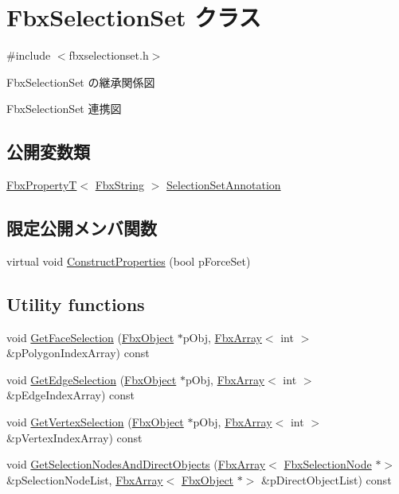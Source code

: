 \hypertarget{class_fbx_selection_set}{}\section{Fbx\+Selection\+Set クラス}
\label{class_fbx_selection_set}


{\ttfamily \#include $<$fbxselectionset.\+h$>$}



Fbx\+Selection\+Set の継承関係図


Fbx\+Selection\+Set 連携図
\subsection*{公開変数類}
\begin{DoxyCompactItemize}
\item 
\hyperlink{class_fbx_property_t}{Fbx\+PropertyT}$<$ \hyperlink{class_fbx_string}{Fbx\+String} $>$ \hyperlink{class_fbx_selection_set_abe27bd368bd6e3df129e808900a72f19}{Selection\+Set\+Annotation}
\end{DoxyCompactItemize}
\subsection*{限定公開メンバ関数}
\begin{DoxyCompactItemize}
\item 
virtual void \hyperlink{class_fbx_selection_set_adcb0af5e3ecfd0957fbf0fe6958d8d6b}{Construct\+Properties} (bool p\+Force\+Set)
\end{DoxyCompactItemize}
\subsection*{Utility functions}
\begin{DoxyCompactItemize}
\item 
void \hyperlink{class_fbx_selection_set_ae304339bd66b4edca36c3f74517cb762}{Get\+Face\+Selection} (\hyperlink{class_fbx_object}{Fbx\+Object} $\ast$p\+Obj, \hyperlink{class_fbx_array}{Fbx\+Array}$<$ int $>$ \&p\+Polygon\+Index\+Array) const
\item 
void \hyperlink{class_fbx_selection_set_a1c3c07b58ae08bf77ce044be79dff6c4}{Get\+Edge\+Selection} (\hyperlink{class_fbx_object}{Fbx\+Object} $\ast$p\+Obj, \hyperlink{class_fbx_array}{Fbx\+Array}$<$ int $>$ \&p\+Edge\+Index\+Array) const
\item 
void \hyperlink{class_fbx_selection_set_a4ec4d2f7e801768d621430636e849101}{Get\+Vertex\+Selection} (\hyperlink{class_fbx_object}{Fbx\+Object} $\ast$p\+Obj, \hyperlink{class_fbx_array}{Fbx\+Array}$<$ int $>$ \&p\+Vertex\+Index\+Array) const
\item 
void \hyperlink{class_fbx_selection_set_af0b2e85e61badfce8f700df48a8c0e50}{Get\+Selection\+Nodes\+And\+Direct\+Objects} (\hyperlink{class_fbx_array}{Fbx\+Array}$<$ \hyperlink{class_fbx_selection_node}{Fbx\+Selection\+Node} $\ast$$>$ \&p\+Selection\+Node\+List, \hyperlink{class_fbx_array}{Fbx\+Array}$<$ \hyperlink{class_fbx_object}{Fbx\+Object} $\ast$$>$ \&p\+Direct\+Object\+List) const
\end{DoxyCompactItemize}
